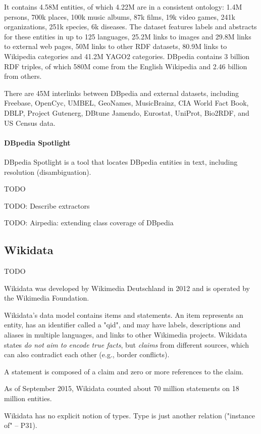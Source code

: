 It contains 4.58M entities, of which 4.22M are in a consistent ontology:
1.4M persons, 700k places, 100k music albums, 87k films, 19k video games, 241k
organizations, 251k species, 6k diseases.
The dataset features labels and abstracts for these entities in up to 125
languages, 25.2M links to images and 29.8M links to external web pages,
50M links to other RDF datasets, 80.9M links to Wikipedia categories and 41.2M
YAGO2 categories.
DBpedia contains 3 billion RDF triples, of which 580M come from the English
Wikipedia and 2.46 billion from others.

There are 45M interlinks between DBpedia and external datasets, including
Freebase, OpenCyc, UMBEL, GeoNames, MusicBrainz, CIA World Fact Book, DBLP,
Project Gutenerg, DBtune Jamendo, Eurostat, UniProt, Bio2RDF, and US Census
data.

\paragraph{DBpedia Spotlight}
DBpedia Spotlight is a tool that locates DBpedia entities in text, including
resolution (disambiguation).

TODO

TODO: Describe extractors

TODO: Airpedia: extending class coverage of DBpedia

\subsection{Wikidata}

TODO

Wikidata was developed by Wikimedia Deutschland in 2012 and is operated by the
Wikimedia Foundation.

Wikidata's data model contains items and statements. An item represents an
entity, has an identifier called a "qid", and may have labels, descriptions and
aliases in multiple languages, and links to other Wikimedia projects. Wikidata
states \textit{do not aim to encode true facts}, but \textit{claims} from
different sources, which can also contradict each other (e.g., border
conflicts).

A statement is composed of a claim and zero or more references to the claim.

As of September 2015, Wikidata counted about 70 million statements on 18 million
entities.

Wikidata has no explicit notion of types. Type is just another relation
("instance of" -- P31).

